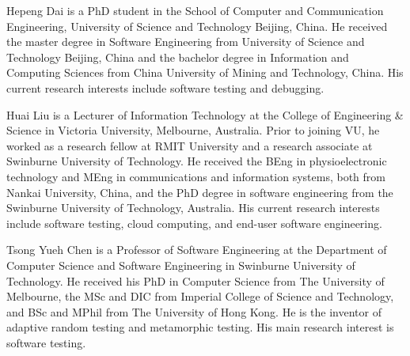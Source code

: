 \documentclass[10pt,journal,compsoc]{IEEEtran}
\begin{document}
\begin{IEEEbiography}{Hepeng Dai} is a PhD student in the School of Computer and Communication Engineering, University of Science and Technology Beijing, China. He received the master degree in Software Engineering from University of Science and Technology Beijing, China and the bachelor degree in Information and Computing Sciences from China University of Mining and Technology, China. His current research interests include software testing and debugging.
\end{IEEEbiography}

\begin{IEEEbiography}{Huai Liu} is a Lecturer of Information Technology at the College of Engineering \& Science in Victoria University, Melbourne, Australia. Prior to joining VU, he worked as a research fellow at RMIT University and a research associate at Swinburne University of Technology. He received the BEng in physioelectronic technology and MEng in communications and information systems, both from Nankai University, China, and the PhD degree in software engineering from the Swinburne University of Technology, Australia. His current research interests include software testing, cloud computing, and end-user software engineering.
\end{IEEEbiography}

\begin{IEEEbiography}{Tsong Yueh Chen} is a Professor of Software Engineering at the Department of Computer Science and Software Engineering in Swinburne University of Technology. He received his PhD in Computer Science from The University of Melbourne, the MSc and DIC from Imperial College of Science and Technology, and BSc and MPhil from The University of Hong Kong. He is the inventor of adaptive random testing and metamorphic testing. His main research interest is software testing.
\end{IEEEbiography}
\end{document}
